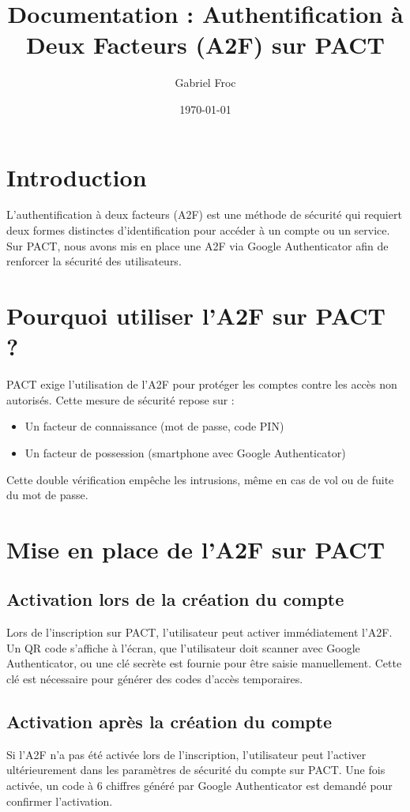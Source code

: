 \documentclass{article}
\begin{document}
\title{Documentation : Authentification à Deux Facteurs (A2F) sur PACT}
\author{Gabriel Froc}
\date{\today}

\maketitle

\section{Introduction}
L'authentification à deux facteurs (A2F) est une méthode de sécurité qui requiert deux formes distinctes d'identification pour accéder à un compte ou un service. Sur PACT, nous avons mis en place une A2F via Google Authenticator afin de renforcer la sécurité des utilisateurs.

\section{Pourquoi utiliser l'A2F sur PACT ?}
PACT exige l'utilisation de l'A2F pour protéger les comptes contre les accès non autorisés. Cette mesure de sécurité repose sur :
\begin{itemize}
    \item Un facteur de connaissance (mot de passe, code PIN)
    \item Un facteur de possession (smartphone avec Google Authenticator)
\end{itemize}
Cette double vérification empêche les intrusions, même en cas de vol ou de fuite du mot de passe.

\section{Mise en place de l'A2F sur PACT}
\subsection{Activation lors de la création du compte}
Lors de l'inscription sur PACT, l'utilisateur peut activer immédiatement l'A2F. Un QR code s'affiche à l'écran, que l'utilisateur doit scanner avec Google Authenticator, ou une clé secrète est fournie pour être saisie manuellement. Cette clé est nécessaire pour générer des codes d'accès temporaires.

\subsection{Activation après la création du compte}
Si l'A2F n'a pas été activée lors de l'inscription, l'utilisateur peut l'activer ultérieurement dans les paramètres de sécurité du compte sur PACT. Une fois activée, un code à 6 chiffres généré par Google Authenticator est demandé pour confirmer l'activation.
\end{document}
